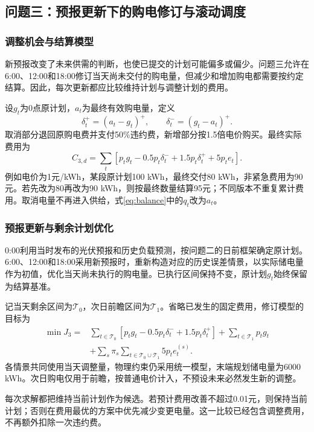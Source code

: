 \subsection{问题三：预报更新下的购电修订与滚动调度}
\subsubsection{调整机会与结算模型}
新预报改变了未来供需的判断，也使已提交的计划可能偏多或偏少。问题三允许在6:00、12:00和18:00修订当天尚未交付的购电量，但减少和增加购电都需要按约定结算。因此，每次更新都应比较维持计划与调整计划的费用。

设$g_t$为0点原计划，$a_t$为最终有效购电量，定义
\begin{equation}
\delta_t^+=(a_t-g_t)^+,\qquad \delta_t^-=(g_t-a_t)^+.
\end{equation}
取消部分退回原购电费并支付50\%违约费，新增部分按1.5倍电价购买。最终实际费用为
\begin{equation}
C_{3,d}=\sum_t\left[p_tg_t-0.5p_t\delta_t^-+1.5p_t\delta_t^++5p_te_t\right].
\label{eq:q3bill}
\end{equation}
例如电价为1元/kWh，某段原计划100 kWh，最终交付80 kWh，非紧急费用为90元。若先改为80再改为90 kWh，则按最终数量结算95元；不同版本不重复累计费用。取消电量不再进入供给，式\eqref{eq:balance}中的$q_t$改为$a_t$。

\subsubsection{预报更新与剩余计划优化}
0:00利用当时发布的光伏预报和历史负载预测，按问题二的日前框架确定原计划。6:00、12:00和18:00采用新预报时，重新构造对应的历史误差情景，以实际储电量作为初值，优化当天尚未执行的购电量。已执行区间保持不变，原计划$g_t$始终保留为结算基准。

记当天剩余区间为$\mathcal T_0$，次日前瞻区间为$\mathcal T_1$。省略已发生的固定费用，修订模型的目标为
\begin{align}
\min J_3={}&\sum_{t\in\mathcal T_0}
  \left[p_tg_t-0.5p_t\delta_t^-+1.5p_t\delta_t^+\right]
  +\sum_{t\in\mathcal T_1}p_tg_t\\
&+\sum_s\pi_s\sum_{t\in\mathcal T_0\cup\mathcal T_1}5p_te_t^{(s)}.
\end{align}
各情景共同使用当天调整量，物理约束仍采用统一模型，末端规划储电量为6000 kWh。次日购电仅用于前瞻，按普通电价计入，不预设未来必然发生新的调整。

每次求解都把维持当前计划作为候选。若预计费用改善不超过0.01元，则保持当前计划；否则在费用最优的方案中优先减少变更电量。这一比较已经包含调整费用，不再额外扣除一次违约费。


